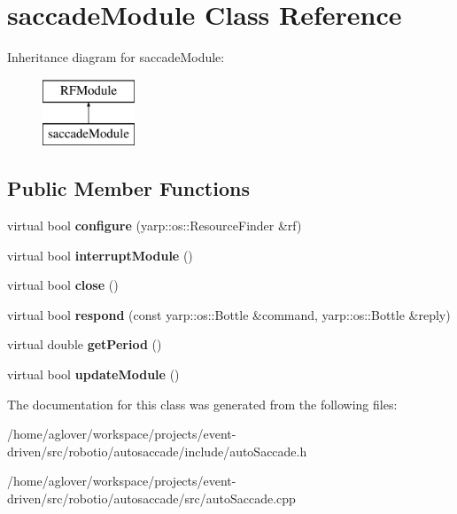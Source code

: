 \hypertarget{classsaccadeModule}{}\section{saccade\+Module Class Reference}
\label{classsaccadeModule}
Inheritance diagram for saccade\+Module\+:\begin{figure}[H]
\begin{center}
\leavevmode
\includegraphics[height=2.000000cm]{classsaccadeModule}
\end{center}
\end{figure}
\subsection*{Public Member Functions}
\begin{DoxyCompactItemize}
\item 
virtual bool {\bfseries configure} (yarp\+::os\+::\+Resource\+Finder \&rf)\hypertarget{classsaccadeModule_aad1f5d8c2f33c4c9dadb8e015de9cafc}{}\label{classsaccadeModule_aad1f5d8c2f33c4c9dadb8e015de9cafc}

\item 
virtual bool {\bfseries interrupt\+Module} ()\hypertarget{classsaccadeModule_ac249486e8d00cdb52ec316c5665032ee}{}\label{classsaccadeModule_ac249486e8d00cdb52ec316c5665032ee}

\item 
virtual bool {\bfseries close} ()\hypertarget{classsaccadeModule_a510ff21af86c5ccf330cf334e63d0f4f}{}\label{classsaccadeModule_a510ff21af86c5ccf330cf334e63d0f4f}

\item 
virtual bool {\bfseries respond} (const yarp\+::os\+::\+Bottle \&command, yarp\+::os\+::\+Bottle \&reply)\hypertarget{classsaccadeModule_a4392d2dc4f60014da07b12772f216430}{}\label{classsaccadeModule_a4392d2dc4f60014da07b12772f216430}

\item 
virtual double {\bfseries get\+Period} ()\hypertarget{classsaccadeModule_a8e603e09181d0cf26b020e6808b9a120}{}\label{classsaccadeModule_a8e603e09181d0cf26b020e6808b9a120}

\item 
virtual bool {\bfseries update\+Module} ()\hypertarget{classsaccadeModule_abb6ee7b679476de9ff75d78b75709e9d}{}\label{classsaccadeModule_abb6ee7b679476de9ff75d78b75709e9d}

\end{DoxyCompactItemize}


The documentation for this class was generated from the following files\+:\begin{DoxyCompactItemize}
\item 
/home/aglover/workspace/projects/event-\/driven/src/robotio/autosaccade/include/auto\+Saccade.\+h\item 
/home/aglover/workspace/projects/event-\/driven/src/robotio/autosaccade/src/auto\+Saccade.\+cpp\end{DoxyCompactItemize}
